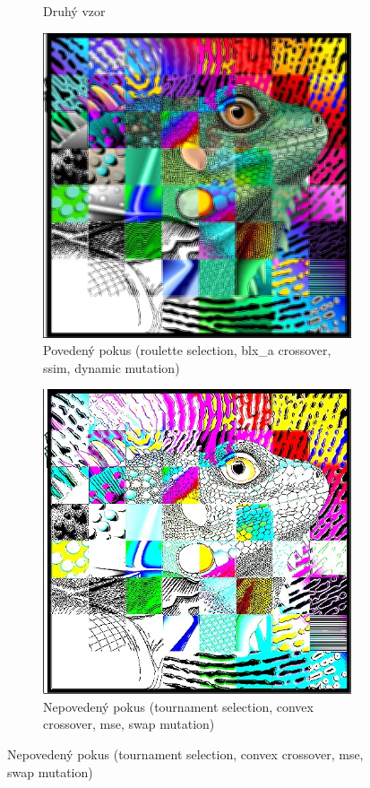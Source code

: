 \documentclass[a4paper,11pt]{scrartcl}
\begin{document}
\begin{figure}[!h]
\begin{subfigure}[b]{0.4\textwidth}
        \caption{Druhý vzor}
        \label{fig:gull}
    \end{subfigure}
        \begin{subfigure}[b]{0.4\textwidth}
        \includegraphics[width=\textwidth]{img/roulette-blx_a-ssim-dynamic_example2.jpg}
        \caption{Povedený pokus (roulette selection, blx\_a crossover, ssim, dynamic mutation)}
        \label{fig:gull}
    \end{subfigure}
        \begin{subfigure}[b]{0.4\textwidth}
        \includegraphics[width=\textwidth]{img/tournament-convex-mse-swap_example2.jpg}
        \caption{Nepovedený pokus (tournament selection, convex crossover, mse, swap mutation)}
        \label{fig:gull}
    \end{subfigure}
\end{figure}
\end{document}

